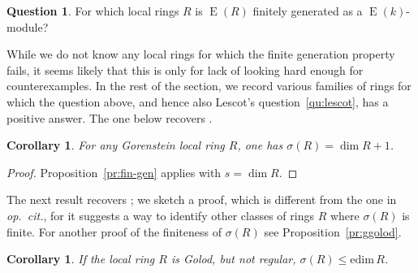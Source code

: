 \documentclass{amsart}
\numberwithin{equation}{section}
\theoremstyle{plain}
\newtheorem{corollary}[equation]{Corollary}
\theoremstyle{definition}
\newtheorem{question}[equation]{Question}
\theoremstyle{remark}
\newcommand{\eee}{\operatorname{E}}
\begin{document}
\begin{question}
\label{qu:fin-gen}
For which local rings $R$ is $\eee(R)$ finitely generated as a $\eee(k)$-module?
\end{question} 

While we do not know any local rings for which the finite generation property fails,  it seems likely that this is only for lack of looking hard enough for counterexamples. In the rest of the section, we record various families of rings for which the question above, and hence also Lescot's question~\ref{qu:lescot}, has a positive answer. The one below recovers \cite[Proposition~3.3]{Lescot:1986}.

\begin{corollary}
\label{co:gorenstein}
For any Gorenstein local ring $R$, one has $\sigma(R)=\dim R +1$.    
\end{corollary}

\begin{proof}
Proposition~\ref{pr:fin-gen} applies with $s=\dim R$.
\end{proof}

The next result recovers \cite[Proposition~3.4]{Lescot:1986}; we sketch a proof, which is different from the one in \emph{op.~cit.}, for it suggests a way to identify other classes of rings $R$ where $\sigma(R)$ is finite. For another proof of the finiteness of $\sigma(R)$ see Proposition~\ref{pr:ggolod}. 

\begin{corollary}
    \label{co:golod}
If the local ring $R$ is Golod, but not regular, $\sigma(R)\le \mathrm{edim}\, R$. 
\end{corollary}
\end{document}
